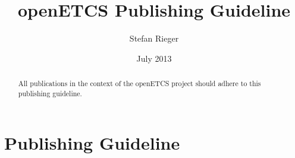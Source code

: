 \documentclass{template/openetcs_article}
\begin{document}
\frontmatter
{}




\title{openETCS Publishing Guideline}

\subtitle{ }

\date{July 2013}


\author{Stefan Rieger}





\begin{abstract}
 All publications in the context of the openETCS project should adhere to this publishing guideline.
\end{abstract}

\maketitle


\section*{Publishing Guideline}
\end{document}
